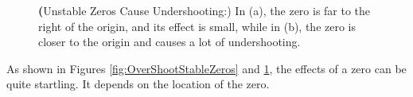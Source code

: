 \begin{figure}[htb]%
\centering
\hfill{}%
\hfill
\hfill{}%
    \caption[]{\textbf(Unstable Zeros Cause Undershooting:) In (a), the zero is far to the right of the origin, and its effect is small, while in (b), the zero is closer to the origin and causes a lot of undershooting. }
    \label{fig:UnderShootUnstableStableZeros}
\end{figure}

As shown in Figures \ref{fig:OverShootStableZeros} and \ref{fig:UnderShootUnstableStableZeros}, the effects of a zero can be quite startling. It depends on the location of the zero.



